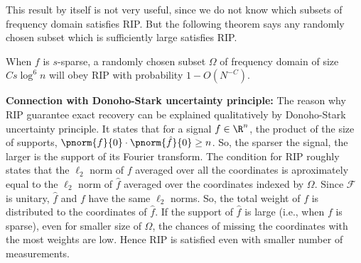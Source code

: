 	This result by itself is not very useful,
	since we do not know which
	subsets of frequency domain satisfies RIP. But the following
	theorem says any randomly chosen subset which is sufficiently
	large satisfies RIP.
	
	\begin{theorem}
		When $f$ is $s$-sparse, a randomly chosen
		subset $\Omega$ of frequency domain
		of size $Cs\log^6 n$ will obey RIP with probability
		$1-O(N^{-C})$.
	\end{theorem}

	\noindent
	\textbf{Connection with Donoho-Stark uncertainty principle:} The
	reason why RIP guarantee
	exact recovery can be explained qualitatively by 
	Donoho-Stark uncertainty principle. It states that for a signal
	$f\in \R^n$, the product of the size of  supports, $\pnorm{f}{0}
	\cdot\pnorm{\hat{f}}{0}\geq n$. So, the sparser the signal,
	the larger is the support of its Fourier transform.
	The condition for RIP roughly states that the
	$\ell_2$ norm of $f$ averaged over all the coordinates is
	aproximately equal to the $\ell_2$ norm of $\hat{f}$ averaged
	over the coordinates indexed by $\Omega$. Since $\mathcal{F}$
	is unitary, $\hat{f}$ and $f$ have the same $\ell_2$ norms.
	So, the total weight of $f$ is distributed
	to the coordinates of $\hat{f}$.
	If the support of $\hat{f}$ is large (i.e., when $f$ is sparse),
	even for smaller
	size of $\Omega$, the chances of missing the coordinates with
	the most weights are low. Hence RIP is satisfied even with
	smaller number of measurements.
	\indent
